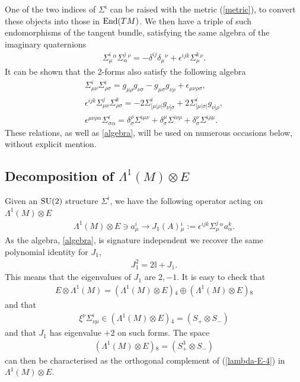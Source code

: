 \documentclass[10pt]{report}
\theoremstyle{definition}
\begin{document}
One of the two indices of $\Sigma^i$ can be raised with the metric (\ref{metric}), to convert these objects into those in ${\rm End}(TM)$. We then have a triple of such endomorphisms of the tangent bundle, satisfying the same algebra of the imaginary quaternions
\begin{align}\label{algebra}
\Sigma^i_{\mu}{}^\alpha \Sigma^j_\alpha{}^\nu = - \delta^{ij} \delta_\mu{}^\nu + \epsilon^{ijk} \Sigma^k_\mu{}^\nu.
\end{align}
It can be shown that the 2-forms also satisfy the following algebra
\begin{align}\label{sigma-sigma}
\Sigma^i_{\mu\nu} \Sigma^i_{\rho\sigma}= g_{\mu\rho} g_{\nu\sigma} - g_{\mu\sigma} g_{\nu\rho} + \epsilon_{\mu\nu\rho\sigma}, \\ 
\label{sigma-sigma-epsilon}
\epsilon^{ijk} \Sigma^j_{\mu\nu} \Sigma^k_{\rho\sigma}= -2\Sigma^i_{[\mu|\rho|} g_{\nu]\sigma} + 2\Sigma^i_{[\mu|\sigma|} g_{\nu]\rho} , \\ \nonumber
\epsilon^{\mu\nu\rho\alpha} \Sigma^i_{\sigma\alpha} = \delta_\sigma^\rho \Sigma^{i\mu\nu} +  \delta_\sigma^\mu \Sigma^{i\nu\rho} + \delta_\sigma^\nu \Sigma^{i\rho\mu} .
\end{align}
These relations, as well as \cref{algebra}, will be used on numerous occasions below, without explicit mention. 

\subsection{\texorpdfstring{Decomposition of $\Lambda^1(M) \otimes E$}{}}

Given an ${\rm SU}(2)$ structure $\Sigma^i$, we have the following operator acting on $\Lambda^1(M) \otimes E$
\begin{align}\label{J-1}
\Lambda^1(M) \otimes E\ni a^i_\mu \to J_1(A){}_\mu^i := \epsilon^{ijk} \Sigma^j_\mu{}^\alpha a^k_\alpha.
\end{align}
As the algebra, \cref{algebra}, is signature independent we recover the same polynomial identity for $J_1$,
\begin{align}
J_1^2 = 2\mathbb{I} + J_1.
\end{align}
This means that the eigenvalues of $J_1$ are $2, -1$. It is easy to check that 
\begin{align}
    E \otimes \Lambda^1(M) = (\Lambda^1(M) \otimes E){}_4 \oplus (\Lambda^1(M) \otimes E){}_8
\end{align}
and that
\begin{align}\label{lambda-E-4}
    \xi^\nu \Sigma^i_{\nu\mu} \in (\Lambda^1(M) \otimes E){}_4 = (S_+ \otimes S_-)
\end{align}
and that $J_1$ has eigenvalue $+2$ on such forms. The space 
\begin{align}\label{lambda-E-8}
(\Lambda^1(M)\otimes E){}_8 = (S^3_+\otimes S_-) 
\end{align}
can then be characterised as the orthogonal complement of (\ref{lambda-E-4}) in $\Lambda^1(M)\otimes E$.
\end{document}

